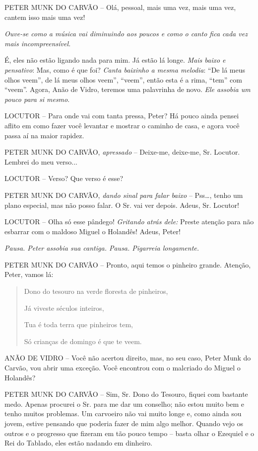 PETER MUNK DO CARVÃO -- Olá, pessoal, mais uma vez, mais uma vez, cantem
isso mais uma vez!

\emph{Ouve-se como a música vai diminuindo aos poucos e como o canto
fica cada vez mais incompreensível.}

É, eles não estão ligando nada para mim. Já estão lá longe. \emph{Mais
baixo e pensativo}: Mas, como é que foi? \emph{Canta baixinho a mesma
melodia}: ``De lá meus olhos veem'', de lá meus olhos veem'', ``veem'',
então esta é a rima, ``tem'' com ``veem''. Agora, Anão de Vidro, teremos
uma palavrinha de novo. \emph{Ele assobia um pouco para si mesmo}.

LOCUTOR -- Para onde vai com tanta pressa, Peter? Há pouco ainda pensei
aflito em como fazer você levantar e mostrar o caminho de casa, e agora
você passa aí na maior rapidez.

PETER MUNK DO CARVÃO, \emph{apressado} -- Deixe-me, deixe-me, Sr.
Locutor. Lembrei do meu verso...

LOCUTOR -- Verso? Que verso é esse?

PETER MUNK DO CARVÃO, \emph{dando sinal para falar baixo} --
Pss\ldots{}, tenho um plano especial, mas não posso falar. O Sr. vai ver
depois. Adeus, Sr. Locutor!

LOCUTOR -- Olha só esse pândego! \emph{Gritando atrás dele:} Preste
atenção para não esbarrar com o maldoso Miguel o Holandês! Adeus, Peter!

\emph{Pausa. Peter assobia sua cantiga. Pausa. Pigarreia longamente.}

PETER MUNK DO CARVÃO -- Pronto, aqui temos o pinheiro grande. Atenção,
Peter, vamos lá:

\begin{quote}
Dono do tesouro na verde floresta de pinheiros,

Já viveste séculos inteiros,

Tua é toda terra que pinheiros tem,

Só crianças de domingo é que te veem.
\end{quote}

ANÃO DE VIDRO -- Você não acertou direito, mas, no seu caso, Peter Munk
do Carvão, vou abrir uma exceção. Você encontrou com o malcriado do
Miguel o Holandês?

PETER MUNK DO CARVÃO -- Sim, Sr. Dono do Tesouro, fiquei com bastante
medo. Apenas procurei o Sr. para me dar um conselho; não estou muito bem
e tenho muitos problemas. Um carvoeiro não vai muito longe e, como ainda
sou jovem, estive pensando que poderia fazer de mim algo melhor. Quando
vejo os outros e o progresso que fizeram em tão pouco tempo -- basta
olhar o Ezequiel e o Rei do Tablado, eles estão nadando em dinheiro.

